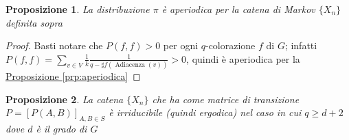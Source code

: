 \documentclass{article}
\newtheorem{proposition}{Proposizione}[section]
\begin{document}
\begin{proposition}
La distribuzione $\pi$ è aperiodica per la catena di Markov $ \{X_n\}$ definita sopra

\end{proposition}

\begin{proof}

Basti notare che $ P(f, f) > 0 $ per ogni $q$-colorazione $f$ di $G$; infatti
$P(f, f)=\sum_{v \in V} \frac{1}{k} \frac{1}{q-\sharp f(\operatorname{Adiacenza}(v))}>0$, quindi è aperiodica per la \hyperref[prp:aperiodica]{Proposizione \ref*{prp:aperiodica}}

\end{proof}


\begin{proposition}
La catena  $ \{X_n\} $ che ha come matrice di transizione $ P = [P(A, B)]_{A,B \in S} $ è irriducibile (quindi ergodica) nel caso in cui $q \geq d + 2$ dove $d$ è il grado di $G$
\end{proposition}
\end{document}
